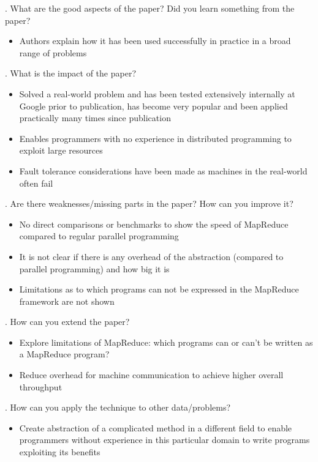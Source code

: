 \documentclass[12pt]{article}
\begin{document}
. What are the good aspects of the paper? Did you learn something from the paper?

\begin{itemize}
    \item Authors explain how it has been used successfully in practice in a broad range of problems
\end{itemize}

. What is the impact of the paper?

\begin{itemize}
    \item Solved a real-world problem and has been tested extensively internally at Google prior to publication, has become very popular and been applied practically many times since publication
    \item Enables programmers with no experience in distributed programming to exploit large resources
    \item Fault tolerance considerations have been made as machines in the real-world often fail
\end{itemize}

. Are there weaknesses/missing parts in the paper? How can you improve it?

\begin{itemize}
    \item No direct comparisons or benchmarks to show the speed of MapReduce compared to regular parallel programming
    \item It is not clear if there is any overhead of the abstraction (compared to parallel programming) and how big it is
    \item Limitations as to which programs can not be expressed in the MapReduce framework are not shown
\end{itemize}

. How can you extend the paper?

\begin{itemize}
    \item Explore limitations of MapReduce: which programs can or can't be written as a MapReduce program?
    \item Reduce overhead for machine communication to achieve higher overall throughput
\end{itemize}

. How can you apply the technique to other data/problems?

\begin{itemize}
    \item Create abstraction of a complicated method in a different field to enable programmers without experience in this particular domain to write programs exploiting its benefits
\end{itemize}
\end{document}
